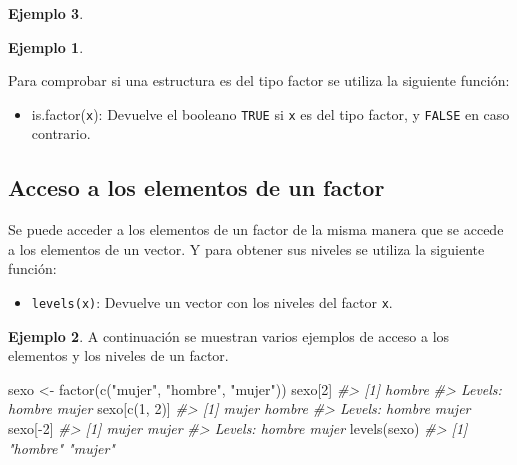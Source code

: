 \documentclass[
]{book}
\newenvironment{Shaded}{\begin{snugshade}}{\end{snugshade}}
\newcommand{\CommentTok}[1]{\textcolor[rgb]{0.56,0.35,0.01}{\textit{#1}}}
\newcommand{\DecValTok}[1]{\textcolor[rgb]{0.00,0.00,0.81}{#1}}
\newcommand{\FunctionTok}[1]{\textcolor[rgb]{0.00,0.00,0.00}{#1}}
\newcommand{\NormalTok}[1]{#1}
\newcommand{\OtherTok}[1]{\textcolor[rgb]{0.56,0.35,0.01}{#1}}
\newcommand{\SpecialCharTok}[1]{\textcolor[rgb]{0.00,0.00,0.00}{#1}}
\newcommand{\StringTok}[1]{\textcolor[rgb]{0.31,0.60,0.02}{#1}}
\providecommand{\tightlist}{%
  \setlength{\itemsep}{0pt}\setlength{\parskip}{0pt}}
\theoremstyle{definition}
\theoremstyle{definition}
\newtheorem{example}{Ejemplo}[chapter]
\theoremstyle{definition}
\theoremstyle{definition}
\theoremstyle{remark}
\begin{document}
\begin{example}
\begin{example}
\end{example}

Para comprobar si una estructura es del tipo factor se utiliza la siguiente función:

\begin{itemize}
\tightlist
\item
  is.factor(\texttt{x}): Devuelve el booleano \texttt{TRUE} si \texttt{x} es del tipo factor, y \texttt{FALSE} en caso contrario.
\end{itemize}

\hypertarget{acceso-a-los-elementos-de-un-factor}{%
\subsection{Acceso a los elementos de un factor}\label{acceso-a-los-elementos-de-un-factor}}

Se puede acceder a los elementos de un factor de la misma manera que se accede a los elementos de un vector. Y para obtener sus niveles se utiliza la siguiente función:

\begin{itemize}
\tightlist
\item
  \texttt{levels(x)}: Devuelve un vector con los niveles del factor \texttt{x}.
\end{itemize}

\begin{example}

A continuación se muestran varios ejemplos de acceso a los elementos y los niveles de un factor.

\begin{Shaded}
\begin{Highlighting}[]
\NormalTok{sexo }\OtherTok{\textless{}{-}} \FunctionTok{factor}\NormalTok{(}\FunctionTok{c}\NormalTok{(}\StringTok{"mujer"}\NormalTok{, }\StringTok{"hombre"}\NormalTok{, }\StringTok{"mujer"}\NormalTok{))}
\NormalTok{sexo[}\DecValTok{2}\NormalTok{]}
\CommentTok{\#\textgreater{} [1] hombre}
\CommentTok{\#\textgreater{} Levels: hombre mujer}
\NormalTok{sexo[}\FunctionTok{c}\NormalTok{(}\DecValTok{1}\NormalTok{, }\DecValTok{2}\NormalTok{)]}
\CommentTok{\#\textgreater{} [1] mujer  hombre}
\CommentTok{\#\textgreater{} Levels: hombre mujer}
\NormalTok{sexo[}\SpecialCharTok{{-}}\DecValTok{2}\NormalTok{]}
\CommentTok{\#\textgreater{} [1] mujer mujer}
\CommentTok{\#\textgreater{} Levels: hombre mujer}
\FunctionTok{levels}\NormalTok{(sexo)}
\CommentTok{\#\textgreater{} [1] "hombre" "mujer"}
\end{Highlighting}
\end{Shaded}


\end{example}
\end{example}
\end{document}
